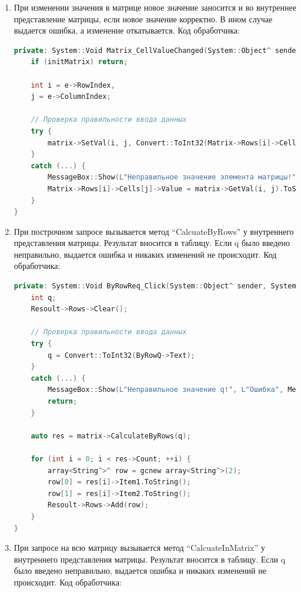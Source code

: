 \documentclass[a4paper,12pt]{article}
\theoremstyle{plain}
\theoremstyle{remark}
\theoremstyle{definition}
\begin{document}
\begin{enumerate}
		\item При изменении значения в матрице новое значение заносится и во внутреннее представление матрицы, если новое значение корректно. В ином случае выдается ошибка, а изменение откатывается. Код обработчика:
		
		\begin{lstlisting}[language=C++]
private: System::Void Matrix_CellValueChanged(System::Object^ sender, System::Windows::Forms::DataGridViewCellEventArgs^ e) {
	if (initMatrix) return;
	
	int i = e->RowIndex,
	j = e->ColumnIndex;
	
	// Проверка правильности ввода данных
	try {
		matrix->SetVal(i, j, Convert::ToInt32(Matrix->Rows[i]->Cells[j]->Value));
	}
	catch (...) {
		MessageBox::Show(L"Неправильное значение элемента матрицы!", L"Ошибка", MessageBoxButtons::OK, MessageBoxIcon::Error);
		Matrix->Rows[i]->Cells[j]->Value = matrix->GetVal(i, j).ToString();
	}
}
		\end{lstlisting}
		
		\item При построчном запросе вызывается метод ``CalcuateByRows'' у внутреннего представления матрицы. Результат вносится в таблицу. Если q было введено неправильно, выдается ошибка и никаких изменений не происходит. Код обработчика:
		
		\begin{lstlisting}[language=C++]
private: System::Void ByRowReq_Click(System::Object^ sender, System::EventArgs^ e) {
	int q;
	Resoult->Rows->Clear();
	
	// Проверка правильности ввода данных
	try {
		q = Convert::ToInt32(ByRowQ->Text);
	}
	catch (...) {
		MessageBox::Show(L"Неправильное значение q!", L"Ошибка", MessageBoxButtons::OK, MessageBoxIcon::Error);
		return;
	}
	
	auto res = matrix->CalculateByRows(q);
	
	for (int i = 0; i < res->Count; ++i) {
		array<String^>^ row = gcnew array<String^>(2);
		row[0] = res[i]->Item1.ToString();
		row[1] = res[i]->Item2.ToString();
		Resoult->Rows->Add(row);
	}
}
		\end{lstlisting}
		
		\item При запросе на всю матрицу вызывается метод ``CalcuateInMatrix'' у внутреннего представления матрицы. Результат вносится в таблицу. Если q было введено неправильно, выдается ошибка и никаких изменений не происходит. Код обработчика:
		

\end{enumerate}
\end{document}
